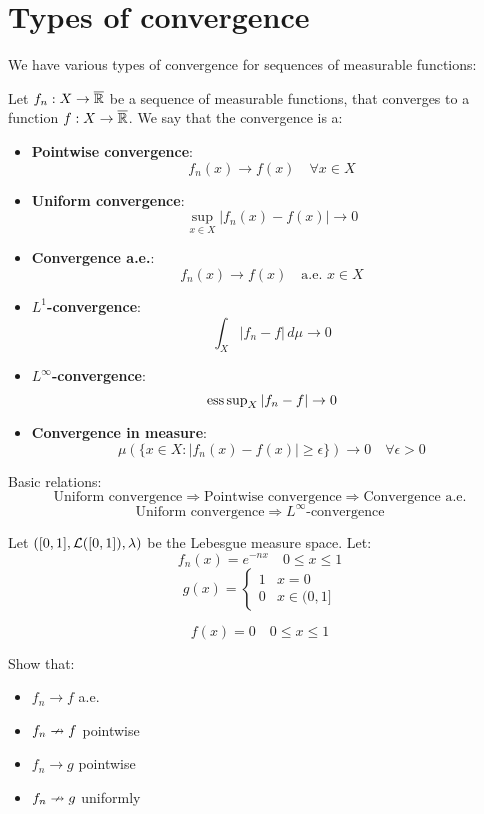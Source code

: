 \chapter{Types of convergence}

We have various types of convergence for sequences of measurable
functions:

\begin{fdefinition}
    Let $f_n: X \to \overline{\mathbb{R}}$ be a sequence of measurable functions,
    that converges to a function $f: X \to \overline{\mathbb{R}}$. We say that the
    convergence is a:
    \vspace{1em}
    \begin{itemize}
        \item \textbf{Pointwise convergence}:
        $$f_n(x) \to f(x) \quad \forall x \in X$$
        \item \textbf{Uniform convergence}:
        $$\sup_{x \in X} |f_n(x) - f(x)| \to 0$$
        \item \textbf{Convergence a.e.}:
        $$f_n(x) \to f(x) \quad \text{a.e. } x \in X$$
        \item \textbf{$L^1$-convergence}:
        $$\int_X |f_n - f| \, d\mu \to 0$$
        \item \textbf{$L^\infty$-convergence}:
        $$\operatorname{ess\,sup}_X |f_n - f| \to 0$$
        \item \textbf{Convergence in measure}:
        $$\mu(\{x \in X: |f_n(x) - f(x)| \geq \epsilon\}) \to 0 \quad \forall \epsilon > 0$$
    \end{itemize}
\end{fdefinition}

\begin{fremark}
    Basic relations:
    $$\text{Uniform convergence} \Rightarrow \text{Pointwise convergence} \Rightarrow \text{Convergence a.e.}$$
    $$\text{Uniform convergence} \Rightarrow \text{$L^\infty$-convergence}$$
\end{fremark}

\begin{fexercise}
    Let $([0, 1], \mathcal{L}([0, 1]), \lambda)$ be the Lebesgue measure space.
    Let:
    $$f_n(x) = e^{-nx} \quad 0 \leq x \leq 1$$
    $$g(x) = \begin{cases}
        1 & x = 0 \\
        0 & x \in (0, 1]
    \end{cases}$$

    $$f(x) = 0 \quad 0 \leq x \leq 1$$

    Show that:

    \begin{itemize}
        \item $f_n \to f$ a.e.
        \item $f_n \nrightarrow f$ pointwise
        \item $f_n \to g$ pointwise
        \item $f_n \nrightarrow g$ uniformly 
    \end{itemize}
\end{fexercise}
\vspace{1em}

